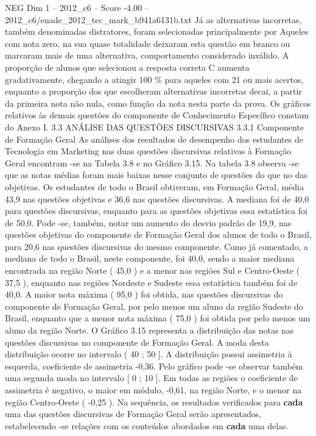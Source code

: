 \begin{textsample}{NEG Dim 1 – 2012\_c6 – Score -4.00 – 2012\_c6/enade\_2012\_tec\_mark\_b941a6131b.txt}
Já as alternativas incorretas, também denominadas distratores, foram selecionadas principalmente por Aqueles com nota zero, na sua quase totalidade deixaram esta questão em branco ou marcaram mais de uma alternativa, comportamento considerado inválido.
A proporção de alunos que selecionou a resposta correta C aumenta gradativamente, chegando a atingir 100 \% para aqueles com 21 ou mais acertos, enquanto a proporção dos que escolheram alternativas incorretas decai, a partir da primeira nota não nula, como função da nota nesta parte da prova.
Os gráficos relativos às demais questões do componente de Conhecimento Específico constam do Anexo I. 3.3 ANÁLISE DAS QUESTÕES DISCURSIVAS 3.3.1 Componente de Formação Geral As análises dos resultados de desempenho dos estudantes de Tecnologia em Marketing nas duas questões discursivas relativas à Formação Geral encontram -se na Tabela 3.8 e no Gráfico 3.15.
Na tabela 3.8 observa -se que as notas médias foram mais baixas nesse conjunto de questões do que no das objetivas.
Os estudantes de todo o Brasil obtiveram, em Formação Geral, média 43,9 nas questões objetivas e 36,6 nas questões discursivas.
A mediana foi de 40,0 para questões discursivas, enquanto para as questões objetivas essa estatística foi de 50,0.
Pode -se, também, notar um aumento do desvio padrão de 19,9, nas questões objetivas do componente de Formação Geral dos alunos de todo o Brasil, para 20,6 nas questões discursivas do mesmo componente.
Como já comentado, a mediana de todo o Brasil, neste componente, foi 40,0, sendo a maior mediana encontrada na região Norte ( 45,0 ) e a menor nas regiões Sul e Centro-Oeste ( 37,5 ), enquanto nas regiões Nordeste e Sudeste essa estatística também foi de 40,0.
A maior nota máxima ( 95,0 ) foi obtida, nas questões discursivas do componente de Formação Geral, por pelo menos um aluno da região Sudeste do Brasil, enquanto que a menor nota máxima ( 75,0 ) foi obtida por pelo menos um aluno da região Norte.
O Gráfico 3.15 representa a distribuição das notas nas questões discursivas no componente de Formação Geral.
A moda desta distribuição ocorre no intervalo ( 40 ; 50 ].
A distribuição possui assimetria à esquerda, coeficiente de assimetria -0,36.
Pelo gráfico pode -se observar também uma segunda moda no intervalo [ 0 ; 10 ].
Em todas as regiões o coeficiente de assimetria é negativo, o maior em módulo, -0,61, na região Norte, e o menor na região Centro-Oeste ( -0,25 ).
Na sequência, os resultados verificados para \textbf{cada} uma das questões discursivas de Formação Geral serão apresentados, estabelecendo -se relações com os conteúdos abordados em \textbf{cada} uma delas.

\end{textsample}
